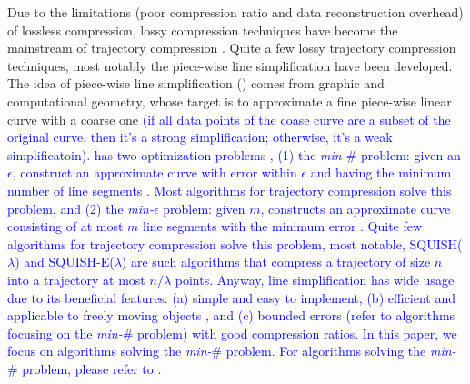 Due to the  limitations (poor compression ratio and data reconstruction overhead) of lossless compression, lossy compression techniques have become the mainstream of trajectory compression \cite{Lin:Operb,Zhang:Evaluation}. Quite a few lossy trajectory compression techniques, most notably the piece-wise line simplification \cite{Keogh:online,Liu:BQS, Muckell:Compression, Chen:Trajectory, Chen:Fast, Cao:Spatio,Shi:Survey,Cao:Dots,Chen:Compression,Ghica:DTracking,Ke:Interval,Lange:Tracking,Lin:Cised,Lin:Operb,Liu:Amnesic,Long:Direction,Meratnia:Spatiotemporal,Muckell:SQUISH,Trajcevski:DDR,Wu:Graph} have been developed. 
%
The idea of piece-wise line simplification (\lsa) comes from graphic and computational geometry, whose target is to approximate a fine piece-wise linear curve with a coarse one \textcolor{blue}{(if all data points of the coase curve are a subset of the original curve, then it's a strong simplification; otherwise, it's a weak simplificatoin). \lsa has two optimization problems \cite{Chan:Optimal, Imai:Optimal,Pavlidis:Segment}, (1) the \emph{min-$\#$} problem: given an $\epsilon$, construct an approximate curve with error within $\epsilon$ and having the minimum number of line segments \cite{Chan:Optimal, Imai:Optimal}. Most \lsa algorithms for trajectory compression \cite{Douglas:Peucker, Hershberger:Speeding, Keogh:online,Liu:BQS, Muckell:Compression, Chen:Trajectory, Chen:Fast, Cao:Spatio,Cao:Dots,Chen:Compression,Ghica:DTracking,Ke:Interval,Lange:Tracking,Lin:Cised,Lin:Operb,Liu:Amnesic,Long:Direction,Meratnia:Spatiotemporal,Trajcevski:DDR,Wu:Graph} solve this problem, and} 
\textcolor{blue}{(2) the \emph{min-$\epsilon$} problem: given $m$, constructs an approximate curve consisting of at most $m$ line segments with the minimum error \cite{Chan:Optimal, Imai:Optimal}. Quite few \lsa algorithms for trajectory compression solve this problem, most notable, SQUISH($\lambda$) \cite{Muckell:SQUISH} and SQUISH-E($\lambda$) \cite{Muckell:Compression} are such algorithms that compress a trajectory of size $n$ into a trajectory at most $n/\lambda$ points. }
%
\textcolor{blue}{Anyway, line simplification has wide usage due to its beneficial features: (a) simple and easy to implement, (b) efficient and applicable to freely moving objects \cite{Popa:Spatio}, and (c) bounded errors (refer to algorithms focusing on the \emph{min-$\#$} problem) with good compression ratios. }
%
\textcolor{blue}{In this paper, we focus on \lsa algorithms solving the \emph{min-$\#$} problem. For algorithms solving the \emph{min-$\#$} problem, please refer to \cite{Muckell:SQUISH,Muckell:Compression,Zhang:Evaluation}.}
%

